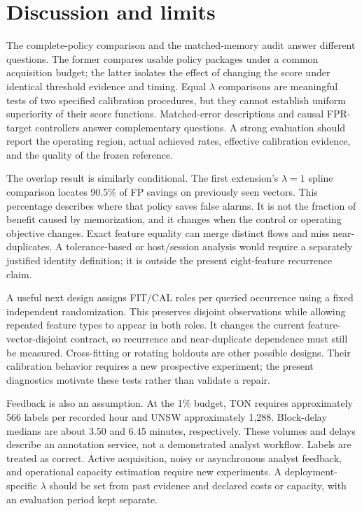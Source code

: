\section{Discussion and limits}
The complete-policy comparison and the matched-memory audit answer different questions. The former compares usable policy packages under a common acquisition budget; the latter isolates the effect of changing the score under identical threshold evidence and timing. Equal $\lambda$ comparisons are meaningful tests of two specified calibration procedures, but they cannot establish uniform superiority of their score functions. Matched-error descriptions and causal FPR-target controllers answer complementary questions. A strong evaluation should report the operating region, actual achieved rates, effective calibration evidence, and the quality of the frozen reference.

The overlap result is similarly conditional. The first extension's $\lambda=1$ spline comparison locates 90.5\% of FP savings on previously seen vectors. This percentage describes where that policy saves false alarms. It is not the fraction of benefit caused by memorization, and it changes when the control or operating objective changes. Exact feature equality can merge distinct flows and miss near-duplicates. A tolerance-based or host/session analysis would require a separately justified identity definition; it is outside the present eight-feature recurrence claim.

A useful next design assigns FIT/CAL roles per queried occurrence using a fixed independent randomization. This preserves disjoint observations while allowing repeated feature types to appear in both roles. It changes the current feature-vector-disjoint contract, so recurrence and near-duplicate dependence must still be measured. Cross-fitting or rotating holdouts are other possible designs. Their calibration behavior requires a new prospective experiment; the present diagnostics motivate these tests rather than validate a repair.

Feedback is also an assumption. At the 1\% budget, TON requires approximately 566 labels per recorded hour and UNSW approximately 1,288. Block-delay medians are about 3.50 and 6.45 minutes, respectively. These volumes and delays describe an annotation service, not a demonstrated analyst workflow. Labels are treated as correct. Active acquisition, noisy or asynchronous analyst feedback, and operational capacity estimation require new experiments. A deployment-specific $\lambda$ should be set from past evidence and declared costs or capacity, with an evaluation period kept separate.

